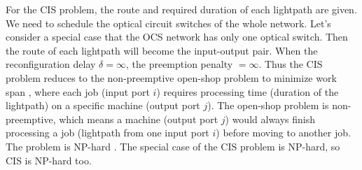 \begin{IEEEproof}
For the CIS problem, the route and required duration of each lightpath are given. We need to schedule the optical circuit switches of the whole network. Let's consider a special case that the OCS network has only one optical switch. Then the route of each lightpath will become the input-output pair. When the reconfiguration delay $\delta=\infty$, the preemption penalty $=\infty$. Thus the CIS problem reduces to the non-preemptive open-shop problem to minimize work span \cite{gonzalez1976open}, where each job (input port $i$) requires processing time (duration of the lightpath) on a specific machine (output port $j$). The open-shop problem is non-preemptive, which means a machine (output port $j$) would always finish processing a job (lightpath from one input port $i$) before moving to another job. The problem is NP-hard \cite{gonzalez1976open}. The special case of the CIS problem is NP-hard, so CIS is NP-hard too.
\end{IEEEproof}

